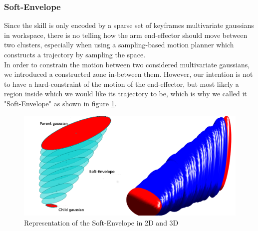 \documentclass[letterpaper, 10 pt, conference]{ieeeconf}  %
\begin{document}
\subsubsection{Soft-Envelope}\leavevmode\par
Since the skill is only encoded by a sparse set of keyframes multivariate gaussians in workspace, there is no telling how the arm end-effector should move between two clusters, especially when using a sampling-based motion planner which constructs a trajectory by sampling the space.\\
In order to constrain the motion between two considered multivariate gaussians, we introduced a constructed zone in-between them. However, our intention is not to have a hard-constraint of the motion of the end-effector, but most likely a region inside which we would like its trajectory to be, which is why we called it "Soft-Envelope" as shown in figure \ref{MixSoftEnvelope}.
\begin{figure}[h]
	\centering
	\includegraphics[scale=0.23]{figure/MixSoftEnvelope.png}
	\caption{Representation of the Soft-Envelope in 2D and 3D}
	\label{MixSoftEnvelope}
\end{figure}
\end{document}
